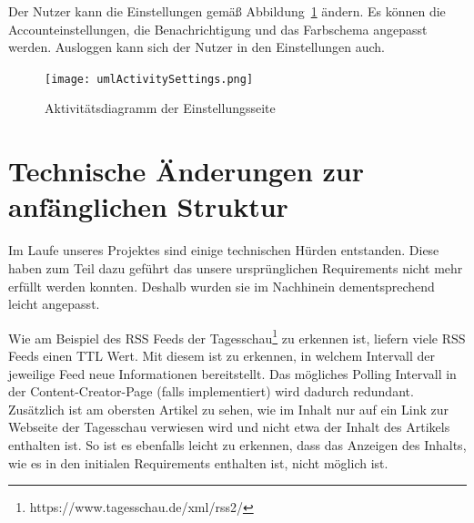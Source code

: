 Der Nutzer kann die Einstellungen gemäß Abbildung~\ref{fig:umlActivitySettings.png} ändern.
Es können die Accounteinstellungen, die Benachrichtigung und das Farbschema angepasst werden.
Ausloggen kann sich der Nutzer in den Einstellungen auch.
\begin{figure}
    \texttt{[image: umlActivitySettings.png]}
    \caption{Aktivitätsdiagramm der Einstellungsseite}
    \label{fig:umlActivitySettings.png}
\end{figure}


\section{Technische Änderungen zur anfänglichen Struktur} \label{tech_changes}
Im Laufe unseres Projektes sind einige technischen Hürden entstanden. Diese haben zum Teil dazu geführt das unsere ursprünglichen Requirements nicht mehr erfüllt werden konnten.
Deshalb wurden sie im Nachhinein dementsprechend leicht angepasst.

\begin{table}[h]
\caption{Tabelle – Änderungen zur anfänglichen Struktur}
\end{table}

Wie am Beispiel des RSS Feeds der Tagesschau\footnote{https://www.tagesschau.de/xml/rss2/} zu erkennen ist, liefern viele RSS Feeds einen TTL Wert.
Mit diesem ist zu erkennen, in welchem Intervall der jeweilige Feed neue Informationen bereitstellt. Das mögliches Polling Intervall in der Content-Creator-Page (falls implementiert) wird dadurch redundant.
Zusätzlich ist am obersten Artikel zu sehen, wie im Inhalt nur auf ein Link zur Webseite der Tagesschau verwiesen wird und nicht etwa der Inhalt des Artikels enthalten ist.
So ist es ebenfalls leicht zu erkennen, dass das Anzeigen des Inhalts, wie es in den initialen Requirements enthalten ist, nicht möglich ist.

